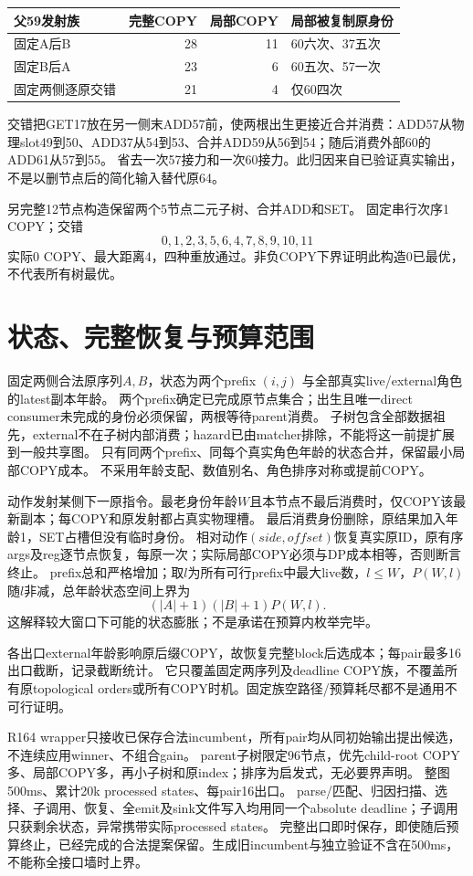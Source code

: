 \documentclass[UTF8,11pt,a4paper]{ctexart}
\begin{document}
\begin{center}\small
\begin{tabular}{lrrl}
\toprule
父59发射族&完整COPY&局部COPY&局部被复制原身份\\
\midrule
固定A后B&28&11&60六次、37五次\\
固定B后A&23&6&60五次、57一次\\
固定两侧逐原交错&21&4&仅60四次\\
\bottomrule
\end{tabular}
\end{center}
交错把GET17放在另一侧末ADD57前，使两根出生更接近合并消费：ADD57从物理slot49到50、ADD37从54到53、合并ADD59从56到54；随后消费外部60的ADD61从57到55。
省去一次57接力和一次60接力。此归因来自已验证真实输出，不是以删节点后的简化输入替代原64。

另完整12节点构造保留两个5节点二元子树、合并ADD和SET。
固定串行次序1 COPY；交错
\[
0,1,2,3,5,6,4,7,8,9,10,11
\]
实际0 COPY、最大距离4，四种重放通过。非负COPY下界证明此构造0已最优，不代表所有树最优。

\section{状态、完整恢复与预算范围}
固定两侧合法原序列$A,B$，状态为两个prefix $(i,j)$ 与全部真实live/external角色的latest副本年龄。
两个prefix确定已完成原节点集合；出生且唯一direct consumer未完成的身份必须保留，两根等待parent消费。
子树包含全部数据祖先，external不在子树内部消费；hazard已由matcher排除，不能将这一前提扩展到一般共享图。
只有同两个prefix、同每个真实角色年龄的状态合并，保留最小局部COPY成本。
不采用年龄支配、数值别名、角色排序对称或提前COPY。

动作发射某侧下一原指令。最老身份年龄$W$且本节点不最后消费时，仅COPY该最新副本；每COPY和原发射都占真实物理槽。
最后消费身份删除，原结果加入年龄1，SET占槽但没有临时身份。
相对动作$(side,offset)$恢复真实原ID，原有序args及reg逐节点恢复，每原一次；实际局部COPY必须与DP成本相等，否则断言终止。
prefix总和严格增加；取$l$为所有可行prefix中最大live数，$l\le W$，$P(W,l)$随$l$非减，总年龄状态空间上界为
\[
(|A|+1)(|B|+1)P(W,l).
\]
这解释较大窗口下可能的状态膨胀；不是承诺在预算内枚举完毕。

各出口external年龄影响原后缀COPY，故恢复完整block后选成本；每pair最多16出口截断，记录截断统计。
它只覆盖固定两序列及deadline COPY族，不覆盖所有原topological orders或所有COPY时机。固定族空路径/预算耗尽都不是通用不可行证明。

R164 wrapper只接收已保存合法incumbent，所有pair均从同初始输出提出候选，不连续应用winner、不组合gain。
parent子树限定96节点，优先child-root COPY多、局部COPY多，再小子树和原index；排序为启发式，无必要界声明。
整图500ms、累计20k processed states、每pair16出口。
parse/匹配、归因扫描、选择、子调用、恢复、全emit及sink文件写入均用同一个absolute deadline；子调用只获剩余状态，异常携带实际processed states。
完整出口即时保存，即使随后预算终止，已经完成的合法提案保留。生成旧incumbent与独立验证不含在500ms，不能称全接口墙时上界。
\end{document}
